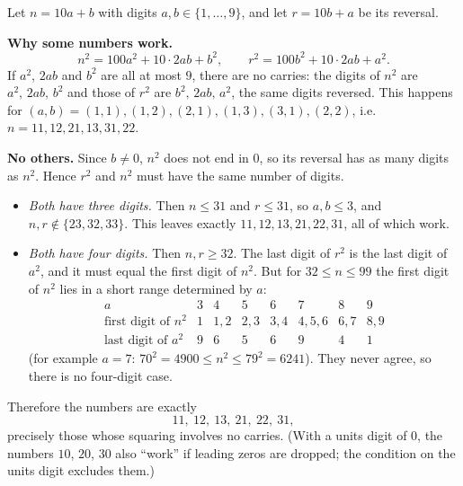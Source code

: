 Let $n=10a+b$ with digits $a,b\in\{1,\dots,9\}$, and let $r=10b+a$ be its reversal.

\textbf{Why some numbers work.}
\[
n^2=100a^2+10\cdot2ab+b^2,\qquad r^2=100b^2+10\cdot2ab+a^2 .
\]
If $a^2$, $2ab$ and $b^2$ are all at most $9$, there are no carries: the digits of $n^2$ are $a^2,\,2ab,\,b^2$ and those of $r^2$ are $b^2,\,2ab,\,a^2$, the same digits reversed. This happens for $(a,b)=(1,1),(1,2),(2,1),(1,3),(3,1),(2,2)$, i.e.\ $n=11,12,21,13,31,22$.

\textbf{No others.} Since $b\ne0$, $n^2$ does not end in $0$, so its reversal has as many digits as $n^2$. Hence $r^2$ and $n^2$ must have the same number of digits.
\begin{itemize}
\item \emph{Both have three digits.} Then $n\le31$ and $r\le31$, so $a,b\le3$, and $n,r\notin\{23,32,33\}$. This leaves exactly $11,12,13,21,22,31$, all of which work.
\item \emph{Both have four digits.} Then $n,r\ge32$. The last digit of $r^2$ is the last digit of $a^2$, and it must equal the first digit of $n^2$. But for $32\le n\le99$ the first digit of $n^2$ lies in a short range determined by $a$:
\[
\begin{array}{c|ccccccc}
a & 3 & 4 & 5 & 6 & 7 & 8 & 9\\ \hline
\text{first digit of }n^2 & 1 & 1,2 & 2,3 & 3,4 & 4,5,6 & 6,7 & 8,9\\
\text{last digit of }a^2 & 9 & 6 & 5 & 6 & 9 & 4 & 1
\end{array}
\]
(for example $a=7$: $70^2=4900\le n^2\le79^2=6241$). They never agree, so there is no four-digit case.
\end{itemize}
Therefore the numbers are exactly
\[
\boxed{11,\ 12,\ 13,\ 21,\ 22,\ 31},
\]
precisely those whose squaring involves no carries. (With a units digit of $0$, the numbers $10$, $20$, $30$ also ``work'' if leading zeros are dropped; the condition on the units digit excludes them.)
